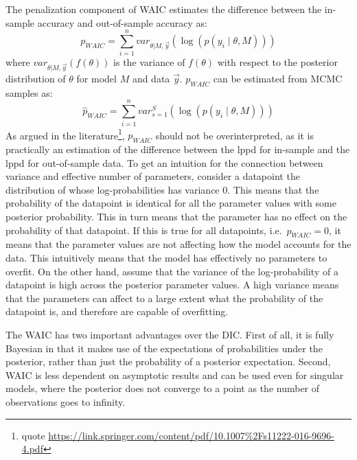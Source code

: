\documentclass[a4paper,12pt,twoside]{article}
\begin{document}
The penalization component of WAIC estimates the difference between the in-sample accuracy and out-of-sample accuracy as:
%
\begin{equation}
p_{WAIC} = \sum_{i=1}^{n} var_{\theta | M, \vec{y}} (\log ( p( y_i \mid \theta, M ) ))
\end{equation}
%
where $var_{\theta | M, \vec{y}} (f(\theta))$ is the variance of $f(\theta)$ with respect to the posterior distribution of $\theta$ for model $M$ and data $\vec{y}$. $p_{WAIC}$ can be estimated from MCMC samples as:
%
\begin{equation}\label{eq:pWAIC}
\hat{p}_{WAIC} = \sum_{i=1}^{n} var_{s=1}^S (\log ( p( y_i \mid \theta, M ) ))
\end{equation}
%
As argued in the literature\footnote{quote \url{https://link.springer.com/content/pdf/10.1007\%2Fs11222-016-9696-4.pdf}}, $p_{WAIC}$ should not be overinterpreted, as it is practically an estimation of the difference between the lppd for in-sample and the lppd for out-of-sample data. To get an intuition for the connection between variance and effective number of parameters, consider a datapoint the distribution of whose log-probabilities has variance 0. This means that the probability of the datapoint is identical for all the parameter values with some posterior probability. This in turn means that the parameter has no effect on the probability of that datapoint. If this is true for all datapoints, i.e.\ $p_{WAIC} = 0$, it means that the parameter values are not affecting how the model accounts for the data. This intuitively means that the model has effectively no parameters to overfit. On the other hand, assume that the variance of the log-probability of a datapoint is high across the posterior parameter values. A high variance means that the parameters can affect to a large extent what the probability of the datapoint is, and therefore are capable of overfitting.

The WAIC has two important advantages over the DIC. First of all, it is fully Bayesian in that it makes use of the expectations of probabilities under the posterior, rather than just the probability of a posterior expectation. Second, WAIC is less dependent on asymptotic results and can be used even for singular models, where the posterior does not converge to a point as the number of observations goes to infinity.
\end{document}
